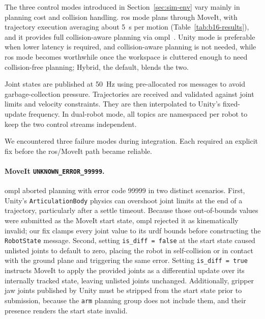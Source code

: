 The three control modes introduced in Section~\ref{sec:sim-env} vary mainly in planning cost and collision handling. \gls{ros} mode plans through MoveIt, with trajectory execution averaging about 5~s per motion (Table~\ref{tab:b16-results}), and it provides full collision-aware planning via \gls{ompl}~\cite{6377468}. Unity mode is preferable when lower latency is required, and collision-aware planning is not needed, while \gls{ros} mode becomes worthwhile once the workspace is cluttered enough to need collision-free planning; Hybrid, the default, blends the two.

Joint states are published at 50~Hz using pre-allocated \gls{ros} messages to avoid garbage-collection pressure. Trajectories are received and validated against joint limits and velocity constraints. They are then interpolated to Unity’s fixed-update frequency. In dual-robot mode, all topics are namespaced per robot to keep the two control streams independent.

We encountered three failure modes during integration. Each required an explicit fix before the \gls{ros}/MoveIt path became reliable.

\paragraph{MoveIt \texttt{UNKNOWN\_ERROR\_99999}.}
\gls{ompl} aborted planning with error code 99999 in two distinct scenarios. First, Unity’s \texttt{ArticulationBody} physics can overshoot joint limits at the end of a trajectory, particularly after a settle timeout. Because those out-of-bounds values were submitted as the MoveIt start state, \gls{ompl} rejected it as kinematically invalid; our fix clamps every joint value to its \gls{urdf} bounds before constructing the \texttt{RobotState} message. Second, setting \texttt{is\_diff = false} at the start state caused unlisted joints to default to zero, placing the robot in self-collision or in contact with the ground plane and triggering the same error. Setting \texttt{is\_diff = true} instructs MoveIt to apply the provided joints as a differential update over its internally tracked state, leaving unlisted joints unchanged. Additionally, gripper jaw joints published by Unity must be stripped from the start state prior to submission, because the \texttt{arm} planning group does not include them, and their presence renders the start state invalid.

